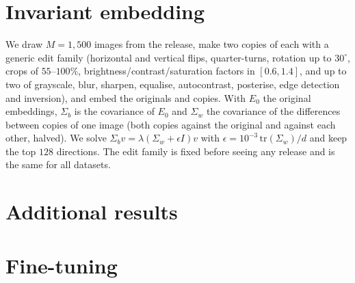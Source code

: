 \section{Invariant embedding}
\label{app:invariant}

We draw $M=1{,}500$ images from the release, make two copies of each with a generic edit family (horizontal and vertical flips, quarter-turns, rotation up to $30^\circ$, crops of $55$--$100\%$, brightness/contrast/saturation factors in $[0.6,1.4]$, and up to two of grayscale, blur, sharpen, equalise, autocontrast, posterise, edge detection and inversion), and embed the originals and copies. With $E_0$ the original embeddings, $\Sigma_b$ is the covariance of $E_0$ and $\Sigma_w$ the covariance of the differences between copies of one image (both copies against the original and against each other, halved). We solve $\Sigma_b v=\lambda(\Sigma_w+\epsilon I)v$ with $\epsilon=10^{-3}\,\mathrm{tr}(\Sigma_w)/d$ and keep the top $128$ directions. The edit family is fixed before seeing any release and is the same for all datasets.

\section{Additional results}
\label{app:orig}
\label{app:backbones}











\FloatBarrier
\section{Fine-tuning}
\label{app:finetune}
